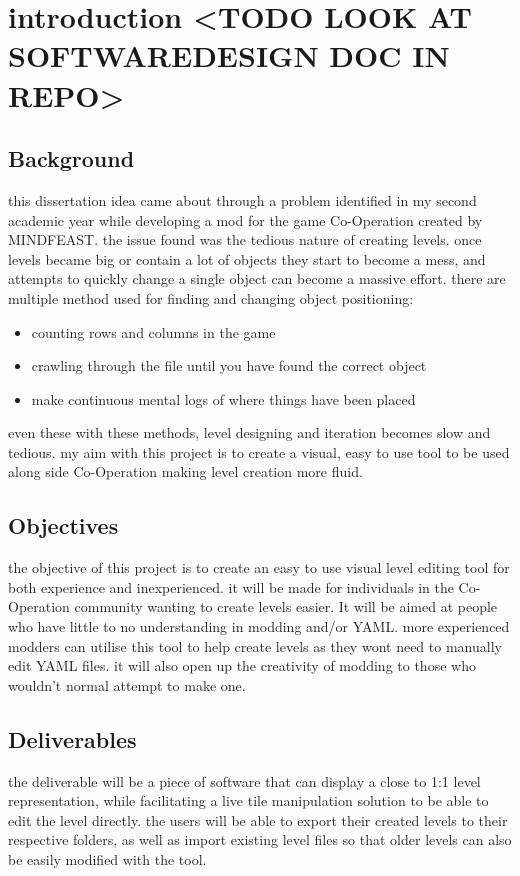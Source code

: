 
\clearpage
{}
\tableofcontents
\clearpage
{}
\listoffigures
\clearpage


\section{introduction <TODO LOOK AT SOFTWAREDESIGN DOC IN REPO>}
\subsection{Background}
this dissertation idea came about through a problem identified in my second academic year while developing a mod for the game Co-Operation created by MINDFEAST. the issue found was the tedious nature of creating levels. once levels became big or contain a lot of objects they start to become a mess, and attempts to quickly change a single object can become a massive effort. there are multiple method used for finding and changing object positioning:
\begin{itemize}
    \item counting rows and columns in the game 
    \item crawling through the file until you have found the correct object
    \item make continuous mental logs of where things have been placed 
\end{itemize}
even these with these methods, level designing and iteration becomes slow and tedious. my aim with this project is to create a visual, easy to use tool to be used along side Co-Operation making level creation more fluid. 
\subsection{Objectives}
the objective of this project is to create an easy to use visual level editing tool for both experience and inexperienced. it will be made for individuals in the Co-Operation community wanting to create levels easier. It will be aimed at people who have little to no understanding in modding and/or YAML. more experienced modders can utilise this tool to help create levels as they wont need to manually edit YAML files. it will also open up the creativity of modding to those who wouldn't normal attempt to make one.
\subsection{Deliverables}
the deliverable will be a piece of software that can display a close to 1:1 level representation, while facilitating a live tile manipulation solution to be able to edit the level directly. the users will be able to export their created levels to their respective folders, as well as import existing level files so that older levels can also be easily modified with the tool.

